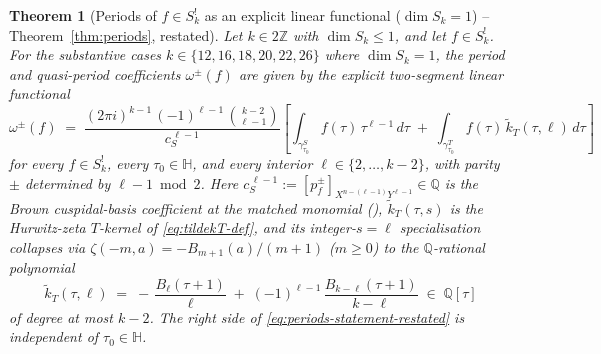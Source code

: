 \documentclass[11pt]{article}
\newtheorem{theorem}{Theorem}[section]
\numberwithin{equation}{section}  %
\newcommand{\HH}{\mathbb{H}}
\newcommand{\ZZ}{\mathbb{Z}}
\newcommand{\QQ}{\mathbb{Q}}
\begin{document}
\begin{theorem}[Periods of $f \in S_k^!$ as an explicit linear functional ($\dim S_k = 1$) -- Theorem~\ref{thm:periods}, restated]\label{thm:periods3}
Let $k \in 2\ZZ$ with $\dim S_k \le 1$, and let $f \in S_k^!$.  For
the substantive cases $k \in \{12, 16, 18, 20, 22, 26\}$ where
$\dim S_k = 1$, the period and quasi-period coefficients
$\omega^\pm(f)$ are given by the explicit two-segment linear
functional
\begin{equation}\label{eq:periods-statement-restated}
  \omega^\pm(f) \;=\; \frac{(2\pi i)^{k - 1}\,(-1)^{\ell - 1}\,\binom{k - 2}{\ell - 1}}{c_S^{\,\ell - 1}}\!\left[
    \int_{\gamma^S_{\tau_0}}\!\! f(\tau)\,\tau^{\ell - 1}\,d\tau
    \;+\;
    \int_{\gamma^T_{\tau_0}}\!\! f(\tau)\,\widetilde{k}_T(\tau, \ell)\,d\tau
  \right]
\end{equation}
for every $f \in S_k^!$, every $\tau_0 \in \HH$, and every interior
$\ell \in \{2, \ldots, k - 2\}$, with parity $\pm$ determined by
$\ell - 1 \bmod 2$.  Here
$c_S^{\,\ell - 1} := [p^\pm_f]_{X^{n - (\ell - 1)} Y^{\ell - 1}} \in \QQ$ is the
Brown cuspidal-basis coefficient at the matched monomial
(\cite{Brown2017,KZ1984}), $\widetilde{k}_T(\tau, s)$ is the
Hurwitz-zeta $T$-kernel of \eqref{eq:tildekT-def}, and its integer-$s = \ell$
specialisation collapses via $\zeta(-m, a) = -B_{m + 1}(a)/(m + 1)$
($m \ge 0$) to the $\QQ$-rational polynomial
\begin{equation}\label{eq:kS-form-restated}
  \widetilde{k}_T(\tau, \ell) \;=\; -\,\frac{B_\ell(\tau + 1)}{\ell} \;+\; (-1)^{\ell - 1}\,\frac{B_{k - \ell}(\tau + 1)}{k - \ell}
  \;\in\; \QQ[\tau]
\end{equation}
of degree at most $k - 2$.  The right side of
\eqref{eq:periods-statement-restated} is independent of $\tau_0 \in \HH$.
\end{theorem}
\end{document}
